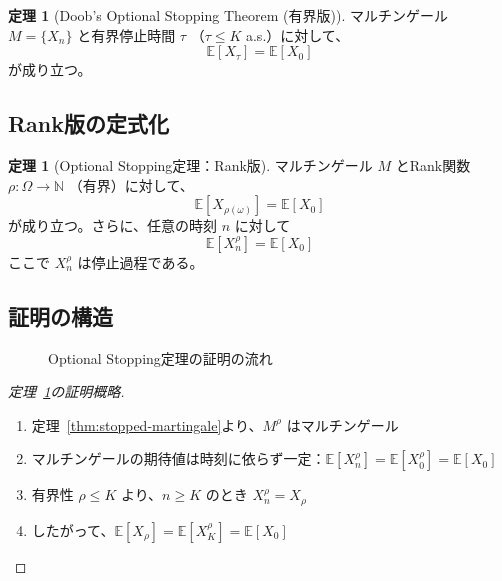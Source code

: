 \documentclass[a4paper,12pt]{ltjsarticle}
\theoremstyle{definition}
\newtheorem{theorem}[definition]{定理}
\newcommand{\N}{\mathbb{N}}
\newcommand{\E}{\mathbb{E}}
\begin{document}
\begin{theorem}[Doob's Optional Stopping Theorem (有界版)]
\label{thm:ost-classical}
マルチンゲール $M = \{X_n\}$ と有界停止時間 $\tau$ （$\tau \leq K$ a.s.）に対して、
\[
\E[X_{\tau}] = \E[X_0]
\]
が成り立つ。
\end{theorem}

\subsection{Rank版の定式化}

\begin{theorem}[Optional Stopping定理：Rank版]
\label{thm:ost-rank}
マルチンゲール $M$ とRank関数 $\rho : \Omega \to \N$ （有界）に対して、
\[
\E[X_{\rho(\omega)}] = \E[X_0]
\]
が成り立つ。さらに、任意の時刻 $n$ に対して
\[
\E[X_n^{\rho}] = \E[X_0]
\]
ここで $X_n^{\rho}$ は停止過程である。
\end{theorem}

\subsection{証明の構造}

\begin{figure}[h]
\centering
{}
\caption{Optional Stopping定理の証明の流れ}
\label{fig:ost-proof-structure}
\end{figure}

\begin{proof}[定理~\ref{thm:ost-rank}の証明概略]
\begin{enumerate}
  \item 定理~\ref{thm:stopped-martingale}より、$M^{\rho}$ はマルチンゲール
  \item マルチンゲールの期待値は時刻に依らず一定：$\E[X_n^{\rho}] = \E[X_0^{\rho}] = \E[X_0]$
  \item 有界性 $\rho \leq K$ より、$n \geq K$ のとき $X_n^{\rho} = X_{\rho}$
  \item したがって、$\E[X_{\rho}] = \E[X_K^{\rho}] = \E[X_0]$
\end{enumerate}
\end{proof}
\end{document}
